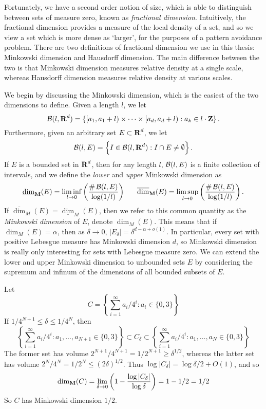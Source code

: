 Fortunately, we have a second order notion of size, which is able to distinguish between sets of measure zero, known as {\it fractional dimension}. Intuitively, the fractional dimension provides a measure of the local density of a set, and so we view a set which is more dense as `larger', for the purposes of a pattern avoidance problem. There are two definitions of fractional dimension we use in this thesis: Minkowski dimension and Hausdorff dimension. The main difference between the two is that Minkowski dimension measures relative density at a single scale, whereas Hausdorff dimension measures relative density at various scales.

We begin by discussing the Minkowski dimension, which is the easiest of the two dimensions to define. Given a length $l$, we let
%
\[ \operatorname{\mathcal{B}}(l,\operatorname{\mathbf{R}}^d) = \left\{ [a_1,a_1 + l) \times \cdots \times [a_d,a_d + l): a_k \in l \cdot \operatorname{\mathbf{Z}} \right\}. \]
%
Furthermore, given an arbitrary set $E \subset \operatorname{\mathbf{R}}^d$, we let
%
\[ \operatorname{\mathcal{B}}(l,E) = \left\{ I \in \operatorname{\mathcal{B}}(l,\operatorname{\mathbf{R}}^d): I \cap E \neq \emptyset \right\}. \]
%
If $E$ is a bounded set in $\operatorname{\mathbf{R}}^d$, then for any length $l$, $\operatorname{\mathcal{B}}(l,E)$ is a finite collection of intervals, and we define the {\it lower} and {\it upper} Minkowski dimension as
%
\[ \operatorname{\underline{\dim}_{\mathbf{M}}}(E) = \liminf_{l \to 0} \left( \frac{\# \operatorname{\mathcal{B}}(l,E)}{\log(1/l)} \right)\ \ \ \ \ \operatorname{\overline{\dim}_{\mathbf{M}}}(E) = \limsup_{l \to 0} \left( \frac{\# \operatorname{\mathcal{B}}(l,E)}{\log(1/l)} \right). \]
%
If $\overline{\dim}_M(E) = \underline{\dim}_M(E)$, then we refer to this common quantity as the {\it Minkowski dimension} of $E$, denote $\dim_M(E)$. This means that if $\dim_M(E) = \alpha$, then as $\delta \to 0$, $|E_\delta| = \delta^{d - \alpha + o(1)}$. In particular, every set with positive Lebesgue measure has Minkowski dimension $d$, so Minkowski dimension is really only interesting for sets with Lebesgue measure zero. We can extend the lower and upper Minkowski dimension to unbounded sets $E$ by considering the supremum and infinum of the dimensions of all bounded subsets of $E$.


\begin{example}
	Let
	\[ C = \left\{ \sum_{i = 1}^\infty a_i/4^i : a_i \in \{ 0, 3 \} \right\} \]
	If $1/4^{N+1} \leq \delta \leq 1/4^N$, then
	\[ \left\{ \sum_{i = 1}^\infty a_i/4^i : a_1, \dots, a_{N+1} \in \{ 0, 3 \} \right\} \subset C_\delta \subset \left\{ \sum_{i = 1}^\infty a_i/4^i : a_1, \dots, a_N \in \{ 0, 3 \} \right\} \]
	The former set has volume $2^{N+1}/4^{N+1} = 1/2^{N+1} \geq \delta^{1/2}$, whereas the latter set has volume $2^N/4^N = 1/2^N \leq (2\delta)^{1/2}$. Thus $\log |C_\delta| = \log \delta/ 2 + O(1)$, and so
	\[ \operatorname{\dim_{\mathbf{M}}}(C) = \lim_{\delta \to 0} \left( 1 - \frac{\log |C_\delta|}{\log \delta} \right) = 1 - 1/2 = 1/2 \]
	So $C$ has Minkowski dimension $1/2$.
\end{example}

